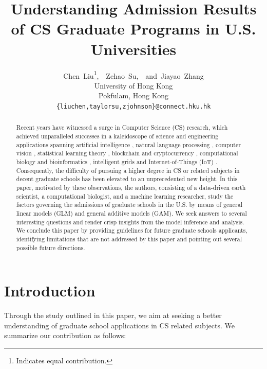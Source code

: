\documentclass{article}
\title{Understanding Admission Results of CS Graduate Programs in U.S. Universities}
\author{
    Chen~Liu\thanks{Indicates equal contribution.},~~Zehao~Su\samethanks{},~~and~Jiayao~Zhang\samethanks{}\\
    University of Hong Kong\\
    Pokfulam, Hong Kong\\
    \texttt{\{liuchen,taylorsu,zjohnson\}@connect.hku.hk}\\
}
\begin{document}
\maketitle

\begin{abstract}
    Recent years have witnessed a surge in Computer Science (CS) research, which achieved unparalleled
    successes in a kaleidoscope of science and engineering applications spanning
    artificial intelligence \cite{}, natural language processing \cite{}, computer vision \cite{},
    statistical learning theory \cite{}, blockchain and cryptocurrency \cite{},
    computational biology and bioinformatics \cite{},
    intelligent grids and Internet-of-Things (IoT) \cite{}. Consequently,
    the difficulty of pursuing a higher degree in CS or related subjects in decent graduate
    schools has been elevated to an unprecedented new height\cite{}. In this paper, motivated
    by these observations, the authors, consisting of a data-driven earth scientist, a computational biologist,
     and a machine learning researcher, study the factors governing the
    admissions of graduate schools in the U.S. by means of general linear
    models (GLM) and general additive models (GAM). We seek answers to several interesting questions and
    render crisp insights from the model inference and analysis.
    We conclude this paper by providing guidelines for future graduate schools
    applicants, identifying limitations that are not addressed by this paper
    and pointing out several possible future directions.
\end{abstract}

\section{Introduction}


Through the study outlined in this paper, we aim at seeking a better understanding of graduate school applications in CS related subjects. We summarize our contribution as follows:
\end{document}
